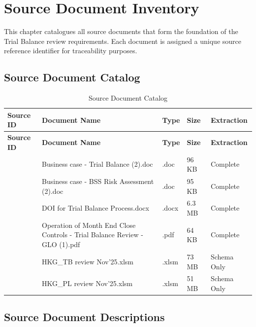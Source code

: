 \chapter{Source Document Inventory}
\label{ch:source-documents}

This chapter catalogues all source documents that form the foundation
of the Trial Balance review requirements. Each document is assigned a
unique source reference identifier for traceability purposes.

\section{Source Document Catalog}
\label{sec:source-catalog}

\begin{longtable}{@{}C{2cm}L{5cm}C{1.5cm}C{2cm}C{2.5cm}@{}}
\caption{Source Document Catalog}
\label{tab:source-catalog} \\
\toprule
\textbf{Source ID} & \textbf{Document Name} & \textbf{Type} & \textbf{Size} & \textbf{Extraction} \\
\midrule
\endfirsthead
\toprule
\textbf{Source ID} & \textbf{Document Name} & \textbf{Type} & \textbf{Size} & \textbf{Extraction} \\
\midrule
\endhead
{} & Business case - Trial Balance (2).doc & .doc & 96 KB & Complete \\
 & Business case - BSS Risk Assessment (2).doc & .doc & 95 KB & Complete \\
 & DOI for Trial Balance Process.docx & .docx & 6.3 MB & Complete \\
 & Operation of Month End Close Controls - Trial Balance Review - GLO (1).pdf & .pdf & 64 KB & Complete \\
 & HKG\_TB review Nov'25.xlsm & .xlsm & 73 MB & Schema Only \\
 & HKG\_PL review Nov'25.xlsm & .xlsm & 51 MB & Schema Only \\
\bottomrule
\end{longtable}

\section{Source Document Descriptions}
\label{sec:source-descriptions}

